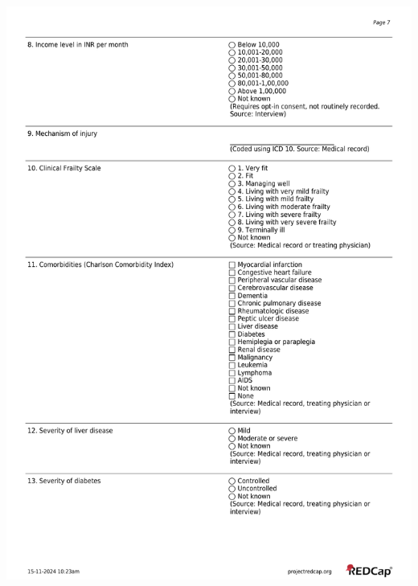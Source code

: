\documentclass[
]{scrartcl}
\begin{document}
\includegraphics{../case-record-form/instrument-pdfs/pages/all-instruments-7.pdf}
\end{document}
